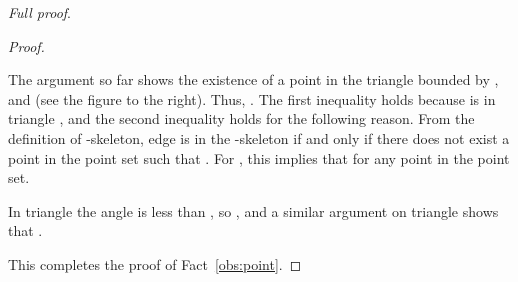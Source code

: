 \documentclass[final]{siamltex}
\newenvironment{fullproof}{\par{\it Full proof}. \ignorespaces}{\endproof}
\begin{document}
\begin{fullproof}
\begin{proof}
The argument so far shows the existence of a point  in the triangle bounded by ,  and  (see the figure to the right). 
Thus, .
The first inequality holds because  is in triangle , 
and the second inequality holds for the following reason. From the definition of -skeleton, edge  is in the -skeleton 
if and only if there does not exist a point 
in the point set such that . For , this implies that
 for any point  in the point set. 

\hspace*{\parindent}
In triangle  the angle  is less than , so 
, 
and a similar argument on triangle  shows that .
\end{window}
This completes the proof of Fact~\ref{obs:point}.
\end{proof}


\end{fullproof}
\end{document}
